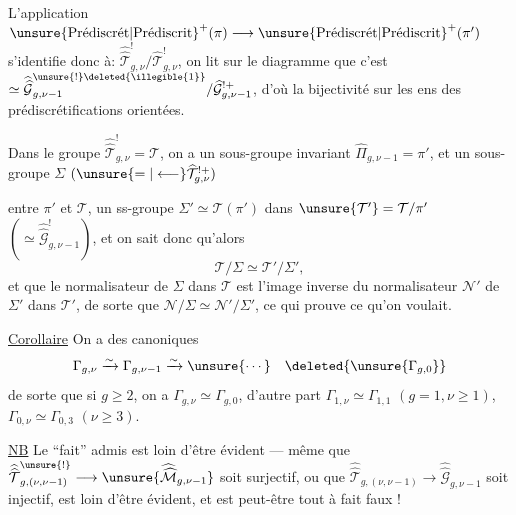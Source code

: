 L'application $\unsure{\text{Prédiscrét}|\text{Prédiscrit}}^{+}(\pi)\longrightarrow
\unsure{\text{Prédiscrét}|\text{Prédiscrit}}^{+}(\pi')$ s'identifie donc à:
$\widehat{\widehat{\mathcal T}}_{g,\nu}^{!}/\widehat{\mathcal T}_{g,\nu}^{!}$,
on lit sur le diagramme que c'est
$\simeq\widehat{\widehat{\mathcal G}}_{g,\nu-1}^{\unsure{!}\deleted{\illegible{1}}}/
\widehat{\mathcal G}_{g,\nu-1}^{!+}$,
d'où la bijectivité sur les ens des prédiscrétifications orientées.

Dans le groupe $\widehat{\widehat{\mathcal T}}_{g,\nu}^{!}=\mathcal T$,
on a un sous-groupe invariant $\widehat{\Pi}_{g,\nu-1}=\pi'$,
et un sous-groupe $\Sigma$ $(\unsure{=|\longleftarrow}\widehat{\mathcal T}_{g,\nu}^{!+})$


entre $\pi'$ et $\mathcal T$,   un ss-groupe $\Sigma'\simeq\mathcal T(\pi')$ dans $\unsure{\mathcal T'}=\mathcal T/\pi'$ $(\simeq\widehat{\widehat{\mathcal G}}^{!}_{g,\nu-1})$, et on sait donc qu'alors
\[
\mathcal T/\Sigma\simeq\mathcal T'/\Sigma',
\]
et  que le normalisateur  de $\Sigma$ dans $\mathcal T$ est l'image inverse du normalisateur $\mathcal N'$ de $\Sigma'$ dans $\mathcal T'$, de sorte que $\mathcal N/\Sigma\simeq\mathcal N'/\Sigma'$, ce qui prouve ce qu'on voulait.

\uline{Corollaire} On a des  canoniques
\[
\Gamma_{g,\nu}\xrightarrow{\sim}\Gamma_{g,\nu-1}\xrightarrow{\sim}\unsure{\cdots}\quad\deleted{\unsure{\Gamma_{g,0}}}
\]
de sorte que si $g\geq2$, on a  $\Gamma_{g,\nu}\simeq\Gamma_{g,0}$, d'autre part $\Gamma_{1,\nu}\simeq\Gamma_{1,1}$ $(g=1,\nu\geq1)$, $\Gamma_{0,\nu}\simeq\Gamma_{0,3}$ $(\nu\geq3)$.

\uline{NB} Le ``fait''  admis est loin d'être évident --- même que $\widehat{\widehat{\mathcal T}}^{\unsure{!}}_{g,(\nu,\nu-1)}\longrightarrow\unsure{\widehat{\widehat{\mathcal M}}_{g,\nu-1}}$ soit surjectif, ou que $\widehat{\widehat{\mathcal T}}_{g,(\nu,\nu-1)}\longrightarrow\widehat{\widehat{\mathcal G}}_{g,\nu-1}$ soit injectif, est loin d'être évident, et est peut-être tout à fait faux !

